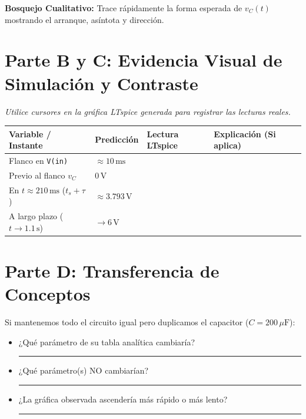 \documentclass[11pt, a4paper]{article}
\begin{document}
\vspace{0.3cm}
\textbf{Bosquejo Cualitativo:} Trace rápidamente la forma esperada de $v_C(t)$ mostrando el arranque, asíntota y dirección.

\vspace{2.5cm}
\section*{Parte B y C: Evidencia Visual de Simulación y Contraste}
\textit{Utilice cursores en la gráfica LTspice generada para registrar las lecturas reales.}

\vspace{0.3cm}
\renewcommand{\arraystretch}{1.5}
\noindent
\begin{tabularx}{\textwidth}{>{\RaggedRight\arraybackslash}p{4cm} >{\centering\arraybackslash}p{2.5cm} >{\centering\arraybackslash}p{2.5cm} >{\RaggedRight\arraybackslash}X}
\toprule
\textbf{Variable / Instante} & \textbf{Predicción} & \textbf{Lectura LTspice} & \textbf{Explicación (Si aplica)} \\ 
\midrule
Flanco en \texttt{V(in)} & $\approx 10\,\text{ms}$ & & \\[0.5cm] 
Previo al flanco $v_C$ & $0\,\text{V}$ & & \\[0.5cm] 
En $t \approx 210\,\text{ms}$ ($t_s + \tau$) & $\approx 3.793\,\text{V}$ & & \\[0.5cm] 
A largo plazo ($t \to 1.1\,\text{s}$) & $\to 6\,\text{V}$ & & \\[0.2cm] 
\bottomrule
\end{tabularx}

\vspace{0.4cm}
\section*{Parte D: Transferencia de Conceptos}
Si mantenemos todo el circuito igual pero duplicamos el capacitor ($C = 200\,\mu\text{F}$):
\begin{itemize}
    \item ¿Qué parámetro de su tabla analítica cambiaría? \rule{5cm}{0.4pt}
    \item ¿Qué parámetro(s) NO cambiarían? \rule{6cm}{0.4pt}
    \item ¿La gráfica observada ascendería más rápido o más lento? \rule{4cm}{0.4pt}
\end{itemize}
\end{document}
